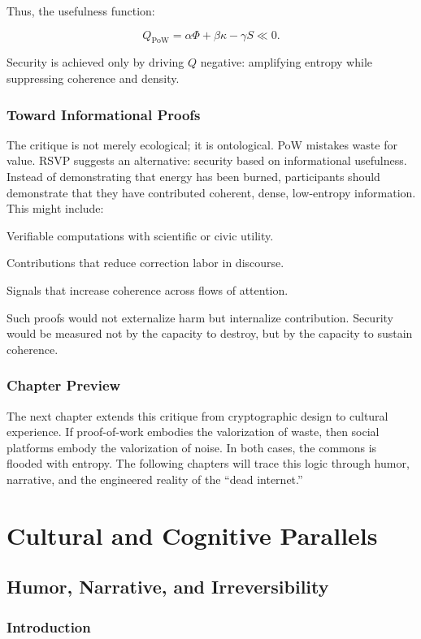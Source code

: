 \documentclass{book}
\begin{document}
Thus, the usefulness function:

\[ Q_{\text{PoW}} = \alpha \Phi + \beta \kappa - \gamma S \ll 0. \]

Security is achieved only by driving \( Q \) negative: amplifying entropy while suppressing coherence and density.

\section{Toward Informational Proofs}

The critique is not merely ecological; it is ontological. PoW mistakes waste for value. RSVP suggests an alternative: security based on informational usefulness. Instead of demonstrating that energy has been burned, participants should demonstrate that they have contributed coherent, dense, low-entropy information. This might include:

Verifiable computations with scientific or civic utility.

Contributions that reduce correction labor in discourse.

Signals that increase coherence across flows of attention.

Such proofs would not externalize harm but internalize contribution. Security would be measured not by the capacity to destroy, but by the capacity to sustain coherence.

\section{Chapter Preview}

The next chapter extends this critique from cryptographic design to cultural experience. If proof-of-work embodies the valorization of waste, then social platforms embody the valorization of noise. In both cases, the commons is flooded with entropy. The following chapters will trace this logic through humor, narrative, and the engineered reality of the “dead internet.”

\part{Cultural and Cognitive Parallels}

\chapter{Humor, Narrative, and Irreversibility}

\section{Introduction}
\end{document}
